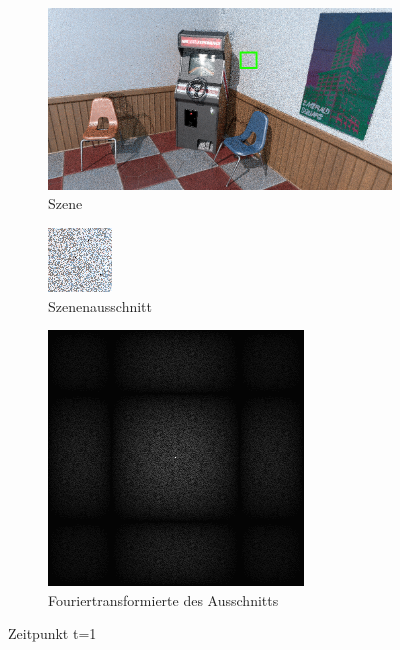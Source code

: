 \begin{figure}[H]

    \begin{subfigure}{\textwidth}
        \centering \includegraphics[scale=.25]{content/TemporalerAlg/Bilder/Sorting/Szene/Szene1.png}
        \caption{Szene}
        \label{fig:Nur_Sorting_Szene_t1}
    \end{subfigure}
    \begin{subfigure}{0.5\textwidth}
        \centering \includegraphics[width=0.4\linewidth]{content/TemporalerAlg/Bilder/Sorting/Ausschnitte/Ausschnitt1.png} 
        \caption{Szenenausschnitt}
        \label{fig:Nur_Sorting_ausschnitt_t1}
    \end{subfigure}
    \begin{subfigure}{0.5\textwidth}
        \centering \includegraphics[width=0.4\linewidth]{content/TemporalerAlg/Bilder/Sorting/Spektren/Ausschnitt1.png}
        \caption{Fouriertransformierte des Ausschnitts}
        \label{fig:Nur_Sorting_Fouriertransformierte_t1}
    \end{subfigure}
        \caption{Zeitpunkt t=1}
        \label{fig:Nur_Sorting_Verlauf_t1}
\end{figure}

